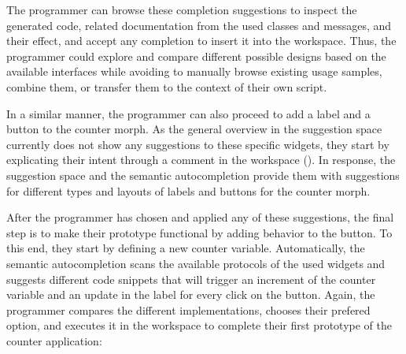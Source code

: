 The programmer can browse these completion suggestions to inspect the generated code, related documentation from the used classes and messages, and their effect, and accept any completion to insert it into the workspace.
Thus, the programmer could explore and compare different possible designs based on the available interfaces while avoiding to manually browse existing usage samples, combine them, or transfer them to the context of their own script.

In a similar manner, the programmer can also proceed to add a label and a button to the counter morph.
As the general overview in the suggestion space currently does not show any suggestions to these specific widgets, they start by explicating their intent through a comment in the workspace ().
In response, the suggestion space and the semantic autocompletion provide them with suggestions for different types and layouts of labels and buttons for the counter morph.

After the programmer has chosen and applied any of these suggestions, the final step is to make their prototype functional by adding behavior to the button.
To this end, they start by defining a new counter variable.
Automatically, the semantic autocompletion scans the available protocols of the used widgets and suggests different code snippets that will trigger an increment of the counter variable and an update in the label for every click on the button.
Again, the programmer compares the different implementations, chooses their prefered option, and executes it in the workspace to complete their first prototype of the counter application:

